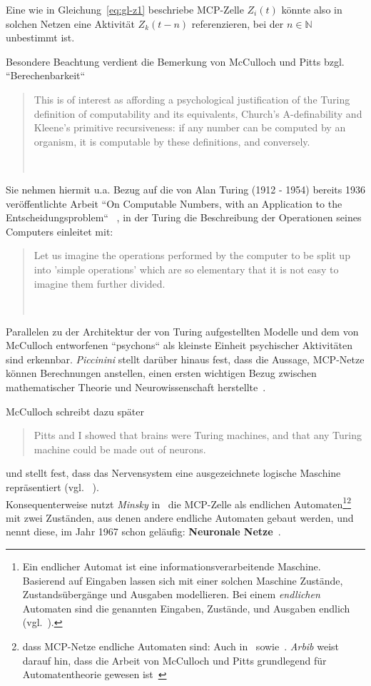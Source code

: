 \noindent
Eine wie in Gleichung~\ref{eq:gl-z1} beschriebe MCP-Zelle $Z_i(t)$ könnte also in solchen Netzen eine Aktivität $Z_k(t-n)$ referenzieren, bei der $n \in \mathbb{N}$ unbestimmt ist.

\noindent
Besondere Beachtung verdient die Bemerkung von McCulloch und Pitts bzgl. ``Berechenbarkeit``

\blockquote[{~\cite[113]{MP43}}]{
    This is of interest as affording a psychological justification of the Turing definition of computability and its equivalents, Church’s A-definability and Kleene’s primitive recursiveness: if any number can be computed by an organism, it is computable by these definitions, and conversely.
}

\noindent
Sie nehmen hiermit u.a. Bezug auf die von Alan Turing (1912 - 1954) bereits 1936 veröffentlichte Arbeit ``On Computable Numbers, with an Application to the Entscheidungsproblem`` ~\cite{Tur37}, in der Turing die Beschreibung der Operationen seines Computers einleitet mit:

\blockquote[{~\cite[250]{Tur37}}]{
    Let us imagine the operations performed by the computer to be split up into 'simple operations' which are so elementary that it is not easy to imagine them further divided.
}

\noindent
Parallelen zu der Architektur der von Turing aufgestellten Modelle und dem von McCulloch entworfenen ``psychons`` als kleinste Einheit psychischer Aktivitäten sind erkennbar. \textit{Piccinini} stellt darüber hinaus fest, dass die Aussage, MCP-Netze können Berechnungen anstellen, einen ersten wichtigen Bezug zwischen mathematischer Theorie und Neurowissenschaft herstellte~\cite[197]{Pic04}.

\noindent
McCulloch schreibt dazu später

\blockquote[{\cite[164]{Mcc16}}]{
    Pitts and I showed that brains were Turing machines, and that any Turing machine could be made out of neurons.
}

\noindent
und stellt fest, dass das Nervensystem eine ausgezeichnete logische Maschine repräsentiert (vgl. ~\cite[80]{Mcc16}).\\

\noindent
Konsequenterweise nutzt \textit{Minsky} in~\cite[32 ff.]{Min67} die MCP-Zelle als endlichen Automaten\footnote{
    Ein endlicher Automat ist eine informationsverarbeitende Maschine. Basierend auf Eingaben lassen sich mit einer solchen Maschine Zustände, Zustandsübergänge und Ausgaben modellieren. Bei einem \textit{endlichen} Automaten sind die genannten Eingaben, Zustände, und Ausgaben endlich (vgl.~\cite[26 ff.]{SSH95}).
}\footnote{
    dass MCP-Netze endliche Automaten sind: Auch in~\cite[76]{Cow90} sowie~\cite[47, ``Satz 2.4``]{Roj93}. \textit{Arbib} weist darauf hin, dass die Arbeit von McCulloch und Pitts grundlegend für Automatentheorie gewesen ist~\cite[8]{Arb19}
} mit zwei Zuständen, aus denen andere endliche Automaten gebaut werden, und nennt diese, im Jahr 1967 schon geläufig: \textbf{Neuronale Netze}~\cite[33]{Min67}.



